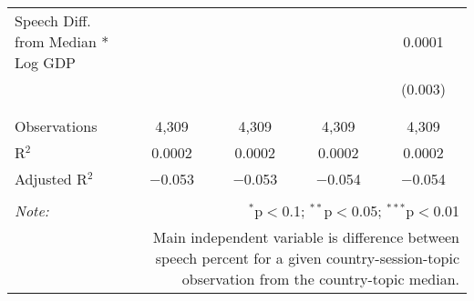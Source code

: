 \begin{table}[!htbp]
\begin{tabular}{@{\extracolsep{5pt}}lcccc}
 Speech Diff. from Median * Log GDP &  &  &  & 0.0001 \\ 
  &  &  &  & (0.003) \\ 
  & & & & \\ 
\hline \\[-1.8ex] 
Observations & 4,309 & 4,309 & 4,309 & 4,309 \\ 
R$^{2}$ & 0.0002 & 0.0002 & 0.0002 & 0.0002 \\ 
Adjusted R$^{2}$ & $-$0.053 & $-$0.053 & $-$0.054 & $-$0.054 \\ 
\hline 
\hline \\[-1.8ex] 
\textit{Note:}  & \multicolumn{4}{r}{$^{*}$p$<$0.1; $^{**}$p$<$0.05; $^{***}$p$<$0.01} \\ 
 & \multicolumn{4}{r}{Main independent variable is difference between speech percent for a given country-session-topic observation from the country-topic median.} \\ 
\end{tabular} 
\end{table} 
